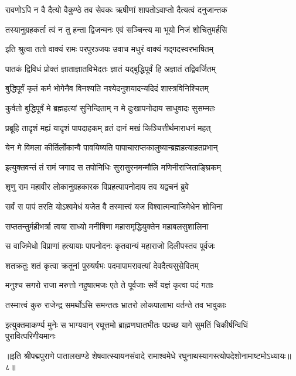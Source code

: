 \twolineshloka
{रावणोऽपि न वै दैत्यो वैकुण्ठे तव सेवकः}
{ऋषीणां शापतोऽवाप्तो दैत्यत्वं दनुजान्तक}%

\twolineshloka
{तस्यानुग्रहकर्ता त्वं न तु हन्ता द्विजन्मनः}
{एवं सञ्चिन्त्य मा भूयो निजं शोचितुमर्हसि}%

\twolineshloka
{इति श्रुत्वा ततो वाक्यं रामः परपुरञ्जयः}
{उवाच मधुरं वाक्यं गद्गदस्वरभाषितम्}%


\twolineshloka
{पातकं द्विविधं प्रोक्तं ज्ञाताज्ञातविभेदतः}
{ज्ञातं यद्बुद्धिपूर्वं हि अज्ञातं तद्विवर्जितम्}%

\twolineshloka
{बुद्धिपूर्वं कृतं कर्म भोगेनैव विनश्यति}
{नश्येदनुशयादन्यदिदं शास्त्रविनिश्चितम्}%

\twolineshloka
{कुर्वतो बुद्धिपूर्वं मे ब्रह्महत्यां सुनिन्दिताम्}
{न मे दुःखापनोदाय साधुवादः सुसम्मतः}%

\twolineshloka
{प्रब्रूहि तादृशं मह्यं यादृशं पापदाहकम्}
{व्रतं दानं मखं किञ्चित्तीर्थमाराधनं महत्}%

\twolineshloka
{येन मे विमला कीर्तिर्लोकान्वै पावयिष्यति}
{पापाचाराप्तकालुष्यान्ब्रह्महत्याहतप्रभान्}%


\twolineshloka
{इत्युक्तवन्तं तं रामं जगाद स तपोनिधिः}
{सुरासुरनमन्मौलि मणिनीराजिताङ्घ्रिकम्}%

\twolineshloka
{शृणु राम महावीर लोकानुग्रहकारक}
{विप्रहत्यापनोदाय तव यद्वचनं ब्रुवे}%

\twolineshloka
{सर्वं स पापं तरति योऽश्वमेधं यजेत वै}
{तस्मात्त्वं यज विश्वात्मन्वाजिमेधेन शोभिना}%

\twolineshloka
{सप्ततन्तुर्महीभर्त्रा त्वया साध्यो मनीषिणा}
{महासमृद्धियुक्तेन महाबलसुशालिना}%

\twolineshloka
{स वाजिमेधो विप्राणां हत्यायाः पापनोदनः}
{कृतवान्यं महाराजो दिलीपस्तव पूर्वजः}%

\twolineshloka
{शतक्रतुः शतं कृत्वा क्रतूनां पुरुषर्षभः}
{पदमापामरावत्यां देवदैत्यसुसेवितम्}%

\twolineshloka
{मनुश्च सगरो राजा मरुत्तो नहुषात्मजः}
{एते ते पूर्वजाः सर्वे यज्ञं कृत्वा पदं गताः}%

\twolineshloka
{तस्मात्त्वं कुरु राजेन्द्र समर्थोऽसि समन्ततः}
{भ्रातरो लोकपालाभा वर्तन्ते तव भावुकाः}%

\twolineshloka
{इत्युक्तमाकर्ण्य मुनेः स भाग्यवान् रघूत्तमो ब्राह्मणघातभीतः}
{पप्रच्छ यागे सुमतिं चिकीर्षन्विधिं पुरावित्परिगीयमानः}%

॥इति श्रीपद्मपुराणे पातालखण्डे शेषवात्स्यायनसंवादे रामाश्वमेधे रघुनाथस्यागस्त्योपदेशोनामाष्टमोऽध्यायः॥८॥

